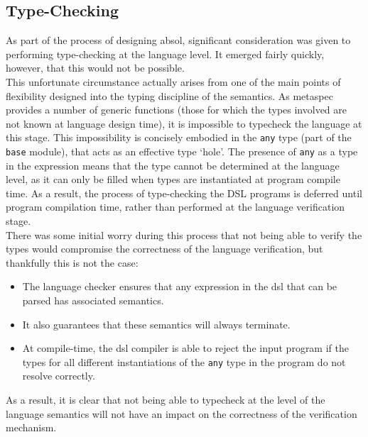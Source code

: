 

\subsection{Type-Checking} %
\label{sub:type_checking}
As part of the process of designing \gls{absol}, significant consideration was given to performing type-checking at the language level. 
It emerged fairly quickly, however, that this would not be possible. \\

This unfortunate circumstance actually arises from one of the main points of flexibility designed into the typing discipline of the semantics. 
As \gls{metaspec} provides a number of generic functions (those for which the types involved are not known at language design time), it is impossible to typecheck the language at this stage.
This impossibility is concisely embodied in the \texttt{any} type (part of the \texttt{base} module), that acts as an effective type `hole'.
The presence of \texttt{any} as a type in the expression means that the type cannot be determined at the language level, as it can only be filled when types are instantiated at program compile time.
As a result, the process of type-checking the DSL programs is deferred until program compilation time, rather than performed at the language verification stage.\\

There was some initial worry during this process that not being able to verify the types would compromise the correctness of the language verification, but thankfully this is not the case:
\begin{itemize}
    \item The language checker ensures that any expression in the \gls{dsl} that can be parsed has associated semantics.
    \item It also guarantees that these semantics will always terminate.
    \item At compile-time, the \gls{dsl} compiler is able to reject the input program if the types for all different instantiations of the \texttt{any} type in the program do not resolve correctly. 
\end{itemize}

As a result, it is clear that not being able to typecheck at the level of the language semantics will not have an impact on the correctness of the verification mechanism.

